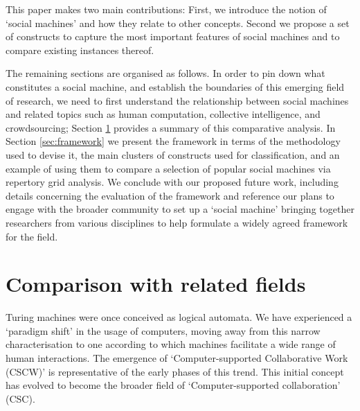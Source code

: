 \documentclass{sig-alternate}
\begin{document}
This paper makes two main contributions: First, we introduce the notion of `social machines' and how they relate to other concepts. Second we propose a set of constructs to capture the most important features of social machines and to compare existing instances thereof.

The remaining sections are organised as follows. In order to pin down what constitutes a social machine, and establish the boundaries of this emerging field of research, we need to first understand the relationship between social machines and related topics such as human computation, collective intelligence, and crowdsourcing; Section \ref{sec:comparison} provides a summary of this comparative analysis. In Section \ref{sec:framework} we present the framework in terms of the methodology used to devise it, the main clusters of constructs used for classification, and an example of using them to compare a selection of popular social machines via repertory grid analysis. We conclude with our proposed future work, including details concerning the evaluation of the framework and reference our plans to engage with the broader community to set up a `social machine' bringing together researchers from various disciplines to help formulate a widely agreed framework for the field.

\section{Comparison with related fields}
\label{sec:comparison}
Turing machines were once conceived as logical automata. We have experienced a `paradigm shift' in the usage of computers, moving away from this narrow characterisation to one according to which machines facilitate a wide range of human interactions. The emergence of `Computer-supported Collaborative Work (CSCW)' \cite{grudin1994computer} is representative of the early phases of this trend. This initial concept has evolved to become the broader field of `Computer-supported collaboration' (CSC).
\end{document}
